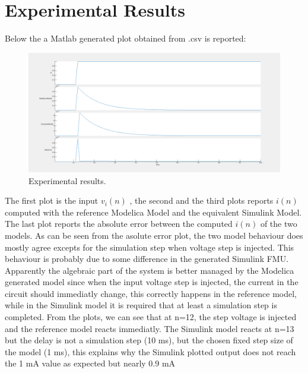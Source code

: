 \section{Experimental Results}
Below the a Matlab generated plot obtained from .csv is reported:
\begin{figure}[ht]
\centering
\includegraphics[width=1.0\textwidth]{CsvComparison1.png}
\caption{\label{fig:ModelComparison}Experimental results.}
\end{figure}
The first plot is the input $v_i(n)$ , the second and the third plots reports $i(n)$ computed with the reference Modelica Model and the equivalent Simulink Model. The last plot reports the absolute error between the computed $i(n)$ of the two models.
\newline
As can be seen from the asolute error plot, the two model behaviour does mostly agree excepts for the simulation step when voltage step is injected. This behaviour is probably due to some difference in the generated Simulink FMU.
\newline 
Apparently the algebraic part of the system is better managed by the Modelica generated model since when the input voltage step is injected, the current in the circuit should immediatly change, this correctly happens in the reference model, while in the Simulink model it is required that at least a simulation step is completed. 
\newline
From the plots, we can see that at n=12, the step voltage is injected and the reference model reacts immediatly. The Simulink model reacts at n=13 but the delay is not a simulation step (10 ms), but the chosen fixed step size of the model (1 ms), this explains why the Simulink plotted output does not reach the 1 mA value as expected but nearly 0.9 mA 


